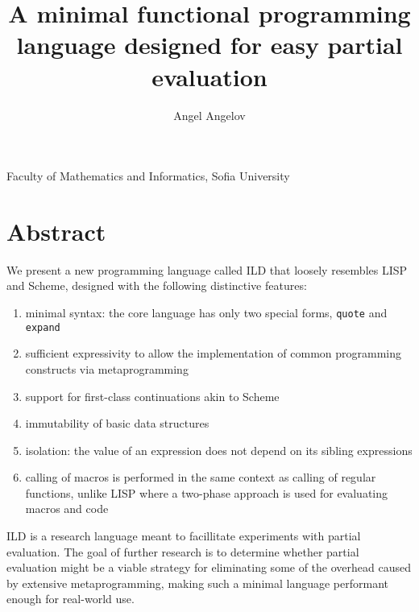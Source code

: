 \documentclass[11pt]{amsart}
\title[Title]{\bf A minimal functional programming language designed for easy partial evaluation}
\author[Angel]{Angel Angelov}
\newcommand\lang{ILD }
\theoremstyle{definition}
\begin{document}
\maketitle

\begin{center}
Faculty of Mathematics and Informatics, Sofia University
\end{center}

\section*{Abstract}

We present a new programming language called \lang that loosely resembles LISP
and Scheme, designed with the following distinctive features:

\begin{enumerate}
    \item minimal syntax: the core language has only two special
    forms, \texttt{quote} and \texttt{expand}
    \item sufficient expressivity to allow the implementation of common programming constructs
    via metaprogramming
    \item support for first-class continuations akin to Scheme
    \item\label{immutable} immutability of basic data structures
    \item\label{isolatedsiblings} isolation: the value of an expression does not
    depend on its sibling expressions
    \item\label{runtimemacros} calling of macros is performed in the same context as
    calling of regular functions, unlike LISP where a two-phase approach is used for evaluating macros and code
\end{enumerate}

\lang is a research language meant to facillitate experiments with partial evaluation.
The goal of further research is to determine whether partial evaluation might be
a viable strategy for eliminating some of the overhead caused by extensive metaprogramming,
making such a minimal language performant enough for real-world use.

%
%
%
%

\bigskip
\end{document}
